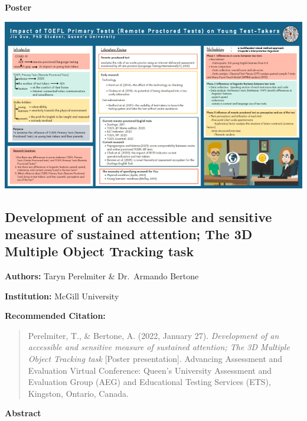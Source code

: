 \documentclass[
]{book}
\begin{document}
\textbf{Poster}

\includegraphics{Content/JG.png}

\newpage

\hypertarget{development-of-an-accessible-and-sensitive-measure-of-sustained-attention-the-3d-multiple-object-tracking-task}{%
\subsection{Development of an accessible and sensitive measure of sustained attention; The 3D Multiple Object Tracking task}\label{development-of-an-accessible-and-sensitive-measure-of-sustained-attention-the-3d-multiple-object-tracking-task}}

\textbf{Authors:} Taryn Perelmiter \& Dr.~Armando Bertone

\textbf{Institution:} McGill University

\textbf{Recommended Citation:}

\begin{quote}
Perelmiter, T., \& Bertone, A. (2022, January 27). \emph{Development of an accessible and sensitive measure of sustained attention; The 3D Multiple Object Tracking task} {[}Poster presentation{]}. Advancing Assessment and Evaluation Virtual Conference: Queen's University Assessment and Evaluation Group (AEG) and Educational Testing Services (ETS), Kingston, Ontario, Canada.
\end{quote}

\textbf{Abstract}
\end{document}
